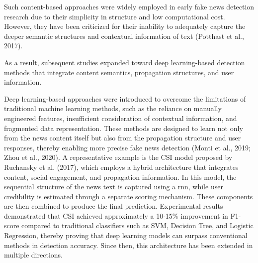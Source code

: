 \documentclass[a4paper,fleqn]{cas-sc}
\begin{document}
Such content-based approaches were widely employed in early fake news detection research due to their simplicity in structure and low computational cost. However, they have been criticized for their inability to adequately capture the deeper semantic structures and contextual information of text (Potthast et al., 2017).

As a result, subsequent studies expanded toward deep learning-based detection methods that integrate content semantics, propagation structures, and user information.

Deep learning-based approaches were introduced to overcome the limitations of traditional machine learning methods, such as the reliance on manually engineered features, insufficient consideration of contextual information, and fragmented data representation. These methods are designed to learn not only from the news content itself but also from the propagation structure and user responses, thereby enabling more precise fake news detection (Monti et al., 2019; Zhou et al., 2020).
A representative example is the CSI model proposed by Ruchansky et al. (2017), which employs a hybrid architecture that integrates content, social engagement, and propagation information. In this model, the sequential structure of the news text is captured using a \gls{rnn}, while user credibility is estimated through a separate scoring mechanism. These components are then combined to produce the final prediction. Experimental results demonstrated that CSI achieved approximately a 10-15\% improvement in F1-score compared to traditional classifiers such as SVM, Decision Tree, and Logistic Regression, thereby proving that deep learning models can surpass conventional methods in detection accuracy. Since then, this architecture has been extended in multiple directions.
\end{document}
